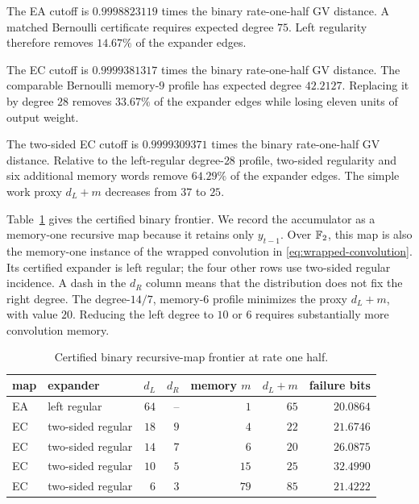 The EA cutoff is $0.9998823119$ times the binary rate-one-half GV distance.
A matched Bernoulli certificate requires expected degree $75$.  Left
regularity therefore removes $14.67\%$ of the expander edges.

The EC cutoff is $0.9999381317$ times the binary rate-one-half GV distance.
The comparable Bernoulli memory-$9$ profile has expected degree $42.2127$.
Replacing it by degree $28$ removes $33.67\%$ of the expander edges while
losing eleven units of output weight.

The two-sided EC cutoff is $0.9999309371$ times the binary rate-one-half GV
distance.  Relative to the left-regular degree-$28$ profile, two-sided
regularity and six additional memory words remove $64.29\%$ of the expander
edges.  The simple work proxy $d_L+m$ decreases from $37$ to $25$.

Table~\ref{tab:binary-recursive-map-frontier} gives the certified binary
frontier.  We record the accumulator as a memory-one recursive map because it
retains only $y_{t-1}$.  Over $\mathbb F_2$, this map is also the memory-one instance
of the wrapped convolution in \eqref{eq:wrapped-convolution}.  Its certified
expander is left regular; the four other rows use two-sided regular incidence.
A dash in the $d_R$ column means that the distribution does not fix the right
degree.
The degree-$14/7$, memory-$6$ profile minimizes the proxy $d_L+m$, with value
$20$.  Reducing the left degree to $10$ or $6$ requires substantially more
convolution memory.

\begin{table}[t]
\centering
\caption{Certified binary recursive-map frontier at rate one half.}
\label{tab:binary-recursive-map-frontier}
\begin{tabular}{@{}llrrrrr@{}}
\toprule
map & expander & $d_L$ & $d_R$ & memory $m$ & $d_L+m$ & failure bits \\
\midrule
EA & left regular & $64$ & -- & $1$  & $65$ & $20.0864$ \\
EC & two-sided regular & $18$ & $9$ & $4$  & $22$ & $21.6746$ \\
EC & two-sided regular & $14$ & $7$ & $6$  & $20$ & $26.0875$ \\
EC & two-sided regular & $10$ & $5$ & $15$ & $25$ & $32.4990$ \\
EC & two-sided regular & $6$  & $3$ & $79$ & $85$ & $21.4222$ \\
\bottomrule
\end{tabular}
\end{table}

